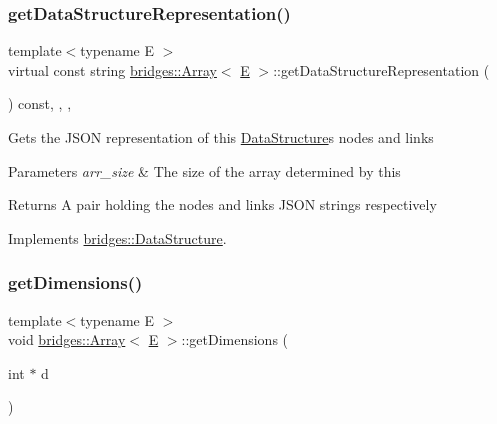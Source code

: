 \subsubsection{\texorpdfstring{getDataStructureRepresentation()}{getDataStructureRepresentation()}}
{\footnotesize\ttfamily template$<$typename E $>$ \\
virtual const string \mbox{\hyperlink{classbridges_1_1_array}{bridges\+::\+Array}}$<$ \mbox{\hyperlink{namespacebridges_acfb0a4f7877d8f63de3e6862004c50eda3a3ea00cfc35332cedf6e5e9a32e94da}{E}} $>$\+::get\+Data\+Structure\+Representation (\begin{DoxyParamCaption}{ }\end{DoxyParamCaption}) const\hspace{0.3cm}{\ttfamily [inline]}, {\ttfamily [final]}, {\ttfamily [override]}, {\ttfamily [virtual]}}

Gets the J\+S\+ON representation of this \mbox{\hyperlink{classbridges_1_1_data_structure}{Data\+Structure}}\textquotesingle{}s nodes and links


\begin{DoxyParams}{Parameters}
{\em arr\+\_\+size} & The size of the array determined by this \\
\hline
\end{DoxyParams}
\begin{DoxyReturn}{Returns}
A pair holding the nodes and links J\+S\+ON strings respectively 
\end{DoxyReturn}


Implements \mbox{\hyperlink{classbridges_1_1_data_structure}{bridges\+::\+Data\+Structure}}.

\mbox{\label{classbridges_1_1_array_ae195a6f06157e82c68483ff636e30f5e}} 
\subsubsection{\texorpdfstring{getDimensions()}{getDimensions()}}
{\footnotesize\ttfamily template$<$typename E $>$ \\
void \mbox{\hyperlink{classbridges_1_1_array}{bridges\+::\+Array}}$<$ \mbox{\hyperlink{namespacebridges_acfb0a4f7877d8f63de3e6862004c50eda3a3ea00cfc35332cedf6e5e9a32e94da}{E}} $>$\+::get\+Dimensions (\begin{DoxyParamCaption}\item[{int $\ast$}]{d }\end{DoxyParamCaption})\hspace{0.3cm}{\ttfamily [inline]}}

